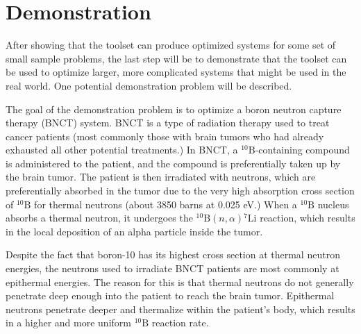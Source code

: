 \section{Demonstration}
\label{sec:proposal:demonstration}

After showing that the toolset can produce optimized systems for some set of small sample problems, the last step will be to demonstrate that the toolset can be used to optimize larger, more complicated systems that might be used in the real world.
One potential demonstration problem will be described.

The goal of the demonstration problem is to optimize a boron neutron capture therapy (BNCT) system.
BNCT is a type of radiation therapy used to treat cancer patients (most commonly those with brain tumors who had already exhausted all other potential treatments.)
In BNCT, a ${}^{10}\text{B}$-containing compound is administered to the patient, and the compound is preferentially taken up by the brain tumor.
The patient is then irradiated with neutrons, which are preferentially absorbed in the tumor due to the very high absorption cross section of ${}^{10}\text{B}$ for thermal neutrons (about 3850 barns at 0.025 eV.)
When a ${}^{10}\text{B}$ nucleus absorbs a thermal neutron, it undergoes the ${}^{10}\text{B}\left(n,\alpha\right){}^{7}\text{Li}$ reaction, which results in the local deposition of an alpha particle inside the tumor.

Despite the fact that boron-10 has its highest cross section at thermal neutron energies, the neutrons used to irradiate BNCT patients are most commonly at epithermal energies.
The reason for this is that thermal neutrons do not generally penetrate deep enough into the patient to reach the brain tumor.
Epithermal neutrons penetrate deeper and thermalize within the patient's body, which results in a higher and more uniform ${}^{10}\text{B}$ reaction rate.

